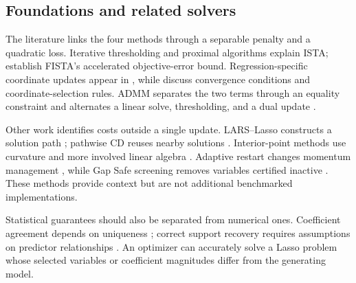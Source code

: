 \documentclass[10pt,letterpaper]{article}
\begin{document}
\subsection{Foundations and related solvers}
The literature links the four methods through a separable penalty and a quadratic loss. Iterative thresholding \citep{daubechies2004} and proximal algorithms \citep{parikh2014} explain ISTA; \mbox{\citet{beck2009}} establish FISTA's accelerated objective-error bound. Regression-specific coordinate updates appear in \citet{wu2008,friedman2010}, while \citet{tseng2001,wright2015} discuss convergence conditions and coordinate-selection rules. ADMM separates the two terms through an equality constraint and alternates a linear solve, thresholding, and a dual update \citep{boyd2011}.

Other work identifies costs outside a single update. LARS--Lasso constructs a solution path \citep{efron2004}; pathwise CD reuses nearby solutions \citep{friedman2010}. Interior-point methods use curvature and more involved linear algebra \citep{kim2007}. Adaptive restart changes momentum management \citep{odonoghue2015}, while Gap Safe screening removes variables certified inactive \citep{ndiaye2017}. These methods provide context but are not additional benchmarked implementations.

Statistical guarantees should also be separated from numerical ones. Coefficient agreement depends on uniqueness \citep{tibshirani2013}; correct support recovery requires assumptions on predictor relationships \citep{zhao2006}. An optimizer can accurately solve a Lasso problem whose selected variables or coefficient magnitudes differ from the generating model.
\end{document}
